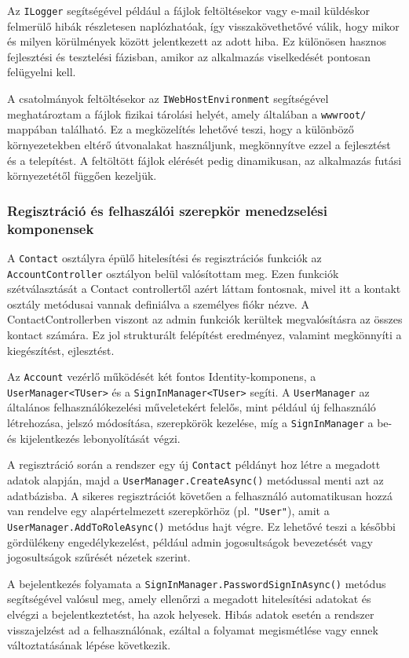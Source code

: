 Az \texttt{ILogger} segítségével például a fájlok feltöltésekor vagy e-mail küldéskor felmerülő hibák részletesen naplózhatóak, így visszakövethetővé válik, hogy mikor és milyen körülmények között jelentkezett az adott hiba. Ez különösen hasznos fejlesztési és tesztelési fázisban, amikor az alkalmazás viselkedését pontosan felügyelni kell.

A csatolmányok feltöltésekor az \texttt{IWebHostEnvironment} segítségével meghatároztam a fájlok fizikai tárolási helyét, amely általában a \texttt{wwwroot/} mappában található. Ez a megközelítés lehetővé teszi, hogy a különböző környezetekben eltérő útvonalakat használjunk, megkönnyítve ezzel a fejlesztést és a telepítést. A feltöltött fájlok elérését pedig dinamikusan, az alkalmazás futási környezetétől függően kezeljük.
\subsubsection{Regisztráció és felhaszálói szerepkör menedzselési komponensek}
A \texttt{Contact} osztályra épülő hitelesítési és regisztrációs funkciók az \texttt{AccountController} osztályon belül valósítottam meg. Ezen funkciók szétválasztását a Contact controllertől azért láttam fontosnak, mivel itt a kontakt osztály metódusai vannak definiálva a személyes fiókr nézve. A ContactControllerben viszont az admin funkciók kerültek megvalósításra az összes kontact számára. Ez jol strukturált felépítést eredményez, valamint megkönnyíti a kiegészítést, ejlesztést. 

Az \texttt{Account} vezérlő működését két fontos Identity-komponens, a \texttt{UserManager<TUser>} és a \texttt{SignInManager<TUser>} segíti. A \texttt{UserManager} az általános felhasználókezelési műveletekért felelős, mint például új felhasználó létrehozása, jelszó módosítása, szerepkörök kezelése, míg a \texttt{SignInManager} a be- és kijelentkezés lebonyolítását végzi.

A regisztráció során a rendszer egy új \texttt{Contact} példányt hoz létre a megadott adatok alapján, majd a \texttt{UserManager.CreateAsync()} metódussal menti azt az adatbázisba. A sikeres regisztrációt követően a felhasználó automatikusan hozzá van rendelve egy alapértelmezett szerepkörhöz (pl. \texttt{"User"}), amit a \texttt{UserManager.AddToRoleAsync()} metódus hajt végre. Ez lehetővé teszi a későbbi gördülékeny engedélykezelést, például admin jogosultságok bevezetését vagy jogosultságok szűrését nézetek szerint.

A bejelentkezés folyamata a \texttt{SignInManager.PasswordSignInAsync()} metódus segítségével valósul meg, amely ellenőrzi a megadott hitelesítési adatokat és elvégzi a bejelentkeztetést, ha azok helyesek. Hibás adatok esetén a rendszer visszajelzést ad a felhasználónak, ezáltal a folyamat megismétlése vagy ennek változtatásának lépése következik.

